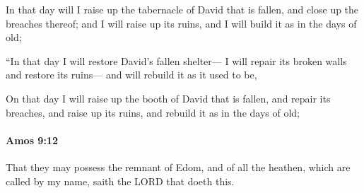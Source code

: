			\begin{versebox}
					\item[BHS] 
					\item[LXX] 
					\item[ASV] In that day will I raise up the tabernacle of David that is fallen, and close up the breaches thereof; and I will raise up its ruins, and I will build it as in the days of old;
					\item[NIV] “In that day I will restore David’s fallen shelter— I will repair its broken walls and restore its ruins— and will rebuild it as it used to be,
					\item[NRSV] On that day I will raise up the booth of David that is fallen, and repair its breaches, and raise up its ruins, and rebuild it as in the days of old;
			\end{versebox}

		\paragraph{Amos 9:12} %
			\label{AMOS-9-12}

			That they may possess the remnant of Edom, and of all the heathen, which are called by my name, saith the LORD that doeth this.

